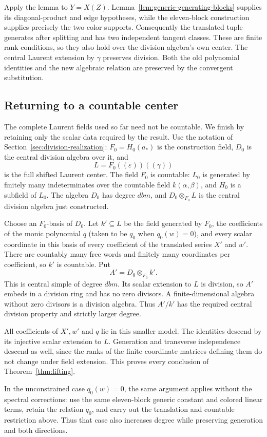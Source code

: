 Apply the lemma to $Y=X(Z)$.  Lemma~\ref{lem:generic-generating-blocks}
supplies its diagonal-product and edge hypotheses, while the
eleven-block construction supplies precisely the two color supports.
Consequently the translated tuple generates after splitting and has
two independent tangent classes.  These are finite rank conditions,
so they also hold over the division algebra's own center.
The central Laurent extension by $\gamma$ preserves division.
Both the old polynomial identities and the new algebraic relation
are preserved by the convergent substitution.

\subsection{Returning to a countable center}

The complete Laurent fields used so far need not be countable.
We finish by retaining only the scalar data required by the result.
Use the notation of Section~\ref{sec:division-realization}:
$F_0=H_0(a_*)$ is the construction field, $D_0$ is the central
division algebra over it, and
\[
 L=F_0((\varepsilon))((\gamma))
\]
is the full shifted Laurent center. The field $F_0$ is countable:
$L_0$ is generated by finitely many indeterminates over the countable
field $k(\alpha,\beta)$, and $H_0$ is a subfield of $L_0$.
The algebra $D_0$ has degree $dbm$, and $D_0\otimes_{F_0}L$
is the central division algebra just constructed.

Choose an $F_0$-basis of $D_0$. Let $k'\subseteq L$ be the field
generated by $F_0$, the coefficients of the monic polynomial $q$
(taken to be $q_0$ when $q_0(w)=0$),
and every scalar coordinate in this basis of every coefficient
of the translated series $X'$ and $w'$. There are countably many
free words and finitely many coordinates per coefficient, so $k'$
is countable.  Put
\[
 A'=D_0\otimes_{F_0} k'.
\]
This is central simple of degree $dbm$.  Its scalar extension to
$L$ is division, so $A'$ embeds in a division ring and has no zero
divisors.  A finite-dimensional algebra without zero divisors is
a division algebra.  Thus $A'/k'$ has the required central division
property and strictly larger degree.

All coefficients of $X',w'$ and $q$ lie in this smaller model.
The identities descend by its injective scalar extension to $L$.
Generation and transverse independence descend as well, since
the ranks of the finite coordinate matrices defining them do not
change under field extension.  This proves every conclusion of
Theorem~\ref{thm:lifting}.

In the unconstrained case $q_0(w)=0$, the same argument applies
without the spectral corrections: use the same eleven-block
generic constant and colored linear terms, retain the relation
$q_0$, and carry out the translation and countable restriction
above.  Thus that case also increases degree while preserving
generation and both directions.

